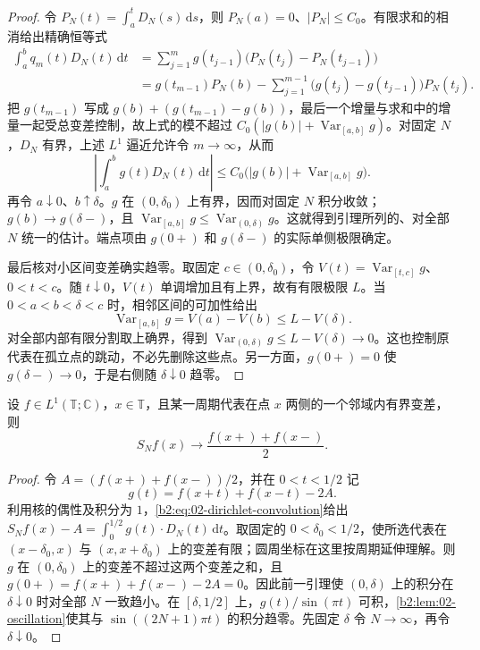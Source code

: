 \begin{proof}
令 \(P_N(t)=\int_a^tD_N(s)\,\mathrm ds\)，则 \(P_N(a)=0\)、\(|P_N|\leq C_0\)。有限求和的相消给出精确恒等式
\[
 \begin{aligned}
 \int_a^b q_m(t)D_N(t)\,\mathrm dt
 &=\sum_{j=1}^m g(t_{j-1})\bigl(P_N(t_j)-P_N(t_{j-1})\bigr)\\
 &=g(t_{m-1})P_N(b)
   -\sum_{j=1}^{m-1}\bigl(g(t_j)-g(t_{j-1})\bigr)P_N(t_j).
 \end{aligned}
\]
把 \(g(t_{m-1})\) 写成 \(g(b)+(g(t_{m-1})-g(b))\)，最后一个增量与求和中的增量一起受总变差控制，故上式的模不超过
\(C_0(|g(b)|+\operatorname{Var}_{[a,b]}g)\)。对固定 \(N\)，\(D_N\) 有界，上述 \(L^1\) 逼近允许令 \(m\to\infty\)，从而
\[
 \left|\int_a^b g(t)D_N(t)\,\mathrm dt\right|
 \leq C_0\bigl(|g(b)|+\operatorname{Var}_{[a,b]}g\bigr).
\]
再令 \(a\downarrow0\)、\(b\uparrow\delta\)。\(g\) 在 \((0,\delta_0)\) 上有界，因而对固定 \(N\) 积分收敛；\(g(b)\to g(\delta-)\)，且 \(\operatorname{Var}_{[a,b]}g\leq\operatorname{Var}_{(0,\delta)}g\)。这就得到引理所列的、对全部 \(N\) 统一的估计。端点项由 \(g(0+)\) 和 \(g(\delta-)\) 的实际单侧极限确定。

最后核对小区间变差确实趋零。取固定 \(c\in(0,\delta_0)\)，令
\(V(t)=\operatorname{Var}_{[t,c]}g\)、\(0<t<c\)。随 \(t\downarrow0\)，\(V(t)\) 单调增加且有上界，故有有限极限 \(L\)。当 \(0<a<b<\delta<c\) 时，相邻区间的可加性给出
\[
 \operatorname{Var}_{[a,b]}g=V(a)-V(b)
 \leq L-V(\delta).
\]
对全部内部有限分割取上确界，得到
\(\operatorname{Var}_{(0,\delta)}g\leq L-V(\delta)\to0\)。这也控制原代表在孤立点的跳动，不必先删除这些点。另一方面，\(g(0+)=0\) 使 \(g(\delta-)\to0\)，于是右侧随 \(\delta\downarrow0\) 趋零。
\end{proof}

\begin{theorem}\label{b2:thm:02-dirichlet-jordan}
设 \(f\in L^1(\mathbb T;\mathbb C)\)，\(x\in\mathbb T\)，且某一周期代表在点 \(x\) 两侧的一个邻域内有界变差，则
\[
 S_Nf(x)\longrightarrow\dfrac{f(x+)+f(x-)}2.
\]
\end{theorem}
\begin{proof}
令 \(A=(f(x+)+f(x-))/2\)，并在 \(0<t<1/2\) 记
\[
 g(t)=f(x+t)+f(x-t)-2A.
\]
利用核的偶性及积分为 \(1\)，\eqref{b2:eq:02-dirichlet-convolution}给出 \(S_Nf(x)-A=\int_0^{1/2}g(t)\cdot D_N(t)\,\mathrm{d}t\)。取固定的 \(0<\delta_0<1/2\)，使所选代表在 \((x-\delta_0,x)\) 与 \((x,x+\delta_0)\) 上的变差有限；圆周坐标在这里按周期延伸理解。则 \(g\) 在 \((0,\delta_0)\) 上的变差不超过这两个变差之和，且 \(g(0+)=f(x+)+f(x-)-2A=0\)。因此前一引理使 \((0,\delta)\) 上的积分在 \(\delta\downarrow0\) 时对全部 \(N\) 一致趋小。在 \([\delta,1/2]\) 上，\(g(t)/\sin(\pi t)\) 可积，\cref{b2:lem:02-oscillation}使其与 \(\sin((2N+1)\pi t)\) 的积分趋零。先固定 \(\delta\) 令 \(N\to\infty\)，再令 \(\delta\downarrow0\)。
\end{proof}

